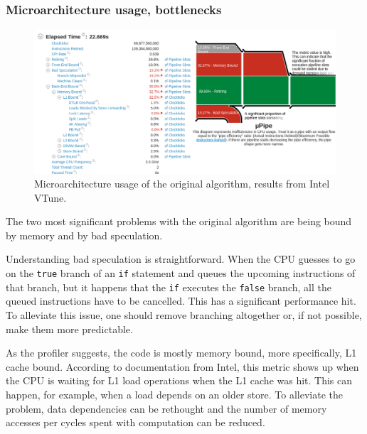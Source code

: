 \documentclass[12pt]{article}
\newcommand{\code}[1]{\texttt{#1}}
\begin{document}
\subsubsection{Microarchitecture usage, bottlenecks}

\begin{figure}[H]
	\begin{center}
		\includegraphics[width=\textwidth]{velout_uarch_overall_orig}
	\end{center}
	\caption{Microarchitecture usage of the original algorithm, results from Intel VTune.}
	\label{fig_velout_uarch_overall_orig}
\end{figure}

The two most significant problems with the original algorithm are being bound by memory and by bad speculation.

Understanding bad speculation is straightforward. When the CPU guesses to go on the \code{true} branch of an \code{if} statement and queues the upcoming instructions of that branch, but it happens that the \code{if} executes the \code{false} branch, all the queued instructions have to be cancelled.\cite{intel_vtune_docs} This has a significant performance hit. To alleviate this issue, one should remove branching altogether or, if not possible, make them more predictable.

As the profiler suggests, the code is mostly memory bound, more specifically, L1 cache bound. According to documentation from Intel, this metric shows up when the CPU is waiting for L1 load operations when the L1 cache was hit. This can happen, for example, when a load depends on an older store. To alleviate the problem, data dependencies can be rethought and the number of memory accesses per cycles spent with computation can be reduced.\cite{intel_vtune_docs}
\end{document}

